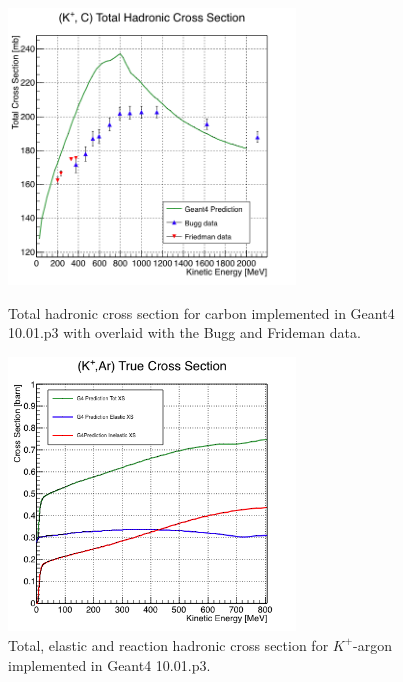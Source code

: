\begin{figure}
\captionsetup{justification=raggedright}  
	\begin{minipage}[t]{.48\textwidth}  
	  \centering  
\includegraphics[width=3in]{Chapter-1/Images/CarbonG4.png}
\caption{Total hadronic cross section for carbon implemented in Geant4  10.01.p3  with overlaid with the Bugg and Frideman data.}
\label{fig:TrueCarbon}
	\end{minipage}%
	\begin{minipage}[t]{0.48\textwidth}  
	  \centering  
\includegraphics[width=3in]{Chapter-1/Images/cKaonsG4.png}
\caption{Total, elastic and reaction hadronic cross section for $K^+$-argon implemented in Geant4  10.01.p3.}
\label{fig:TrueArgon}
	\end{minipage}
	\par
\end{figure}






